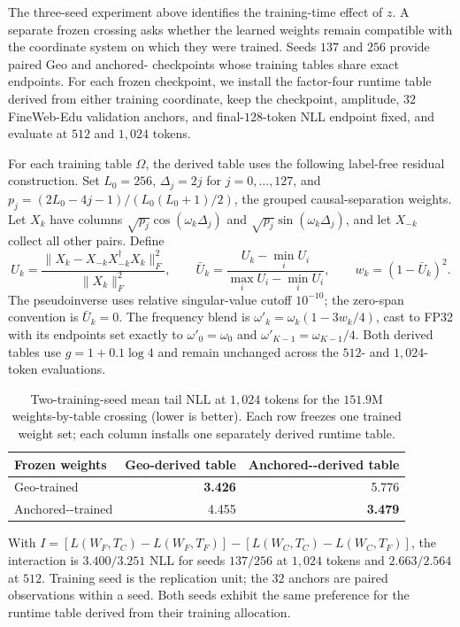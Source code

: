The three-seed experiment above identifies the training-time effect of $z$.
A separate frozen crossing asks whether the learned weights remain compatible
with the coordinate system on which they were trained. Seeds $137$ and $256$
provide paired Geo and anchored-\evq{} checkpoints whose training tables
share exact endpoints. For each frozen checkpoint, we install the factor-four
runtime table derived from either training coordinate, keep the checkpoint,
amplitude, $32$ FineWeb-Edu validation anchors, and final-$128$-token NLL
endpoint fixed, and evaluate at $512$ and $1{,}024$ tokens.

For each training table $\Omega$, the derived table uses the following
label-free residual construction. Set $L_0=256$, $\Delta_j=2j$ for
$j=0,\ldots,127$, and
$p_j=(2L_0-4j-1)/(L_0(L_0+1)/2)$, the grouped causal-separation weights.
Let $X_k$ have columns $\sqrt{p_j}\cos(\omega_k\Delta_j)$ and
$\sqrt{p_j}\sin(\omega_k\Delta_j)$, and let $X_{-k}$ collect all other pairs.
Define
\[
U_k=\frac{\|X_k-X_{-k}X_{-k}^{\dagger}X_k\|_F^2}{\|X_k\|_F^2},
\qquad
\bar U_k=\frac{U_k-\min_i U_i}{\max_i U_i-\min_i U_i},
\qquad w_k=(1-\bar U_k)^2.
\]
The pseudoinverse uses relative singular-value cutoff $10^{-10}$; the
zero-span convention is $\bar U_k=0$. The frequency blend is
$\omega'_k=\omega_k(1-3w_k/4)$, cast to FP32 with its endpoints set exactly
to $\omega'_0=\omega_0$ and $\omega'_{K-1}=\omega_{K-1}/4$.
Both derived tables use $g=1+0.1\log4$ and remain unchanged across the
$512$- and $1{,}024$-token evaluations.

\begin{table}[ht]
\caption{Two-training-seed mean tail NLL at $1{,}024$ tokens for the
$151.9$M weights-by-table crossing (lower is better). Each row freezes one
trained weight set; each column installs one separately derived runtime table.}
\label{tab:crossing-151m}
\centering
\small
\begin{tabular}{@{}lrr@{}}
\toprule
Frozen weights & Geo-derived table & Anchored-\evq{}-derived table \\
\midrule
Geo-trained & \textbf{3.426} & 5.776 \\
Anchored-\evq{}-trained & 4.455 & \textbf{3.479} \\
\bottomrule
\end{tabular}
\end{table}

With
$I=[L(W_F,T_C)-L(W_F,T_F)]-[L(W_C,T_C)-L(W_C,T_F)]$,
the interaction is $3.400/3.251$ NLL for seeds $137/256$ at $1{,}024$
tokens and $2.663/2.564$ at $512$. Training seed is the replication unit;
the $32$ anchors are paired observations within a seed. Both seeds exhibit
the same preference for the runtime table derived from their training allocation.

